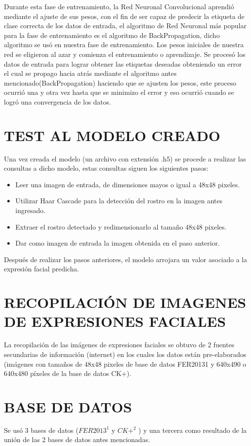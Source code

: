 Durante esta fase de entrenamiento, la Red Neuronal Convolucional aprendió
mediante el ajuste de sus pesos, con el fin de ser capaz de predecir la etiqueta de clase
correcta de los datos de entrada, el algoritmo de Red Neuronal más popular para la fase
de entrenamiento es el algoritmo de BackPropagation, dicho algoritmo se usó en nuestra
fase de entrenamiento. Los pesos iniciales de nuestra red se eligieron al azar y comienza
el entrenamiento o aprendizaje. Se procesó los datos de entrada para lograr obtener las
etiquetas deseadas obteniendo un error el cual se propago hacia atrás mediante el
algoritmo antes mencionado(BackPropagation) haciendo que se ajusten los pesos, este
proceso ocurrió una y otra vez hasta que se minimizo el error y eso ocurrió cuando se
logró una convergencia de los datos.

\section{TEST AL MODELO CREADO}
Una vez creada el modelo (un archivo con extensión .h5) se procede a realizar las
consultas a dicho modelo, estas consultas siguen los siguientes pasos:

\begin{itemize}
\item Leer una imagen de entrada, de dimensiones mayos o igual a 48x48 pixeles.
\item Utilizar Haar Cascade para la detección del rostro en la imagen antes ingresado.
\item Extraer el rostro detectado y redimensionarlo al tamaño 48x48 pixeles.
\item Dar como imagen de entrada la imagen obtenida en el paso anterior.
\end{itemize}
Después de realizar los pasos anteriores, el modelo arrojara un valor asociado a la
expresión facial predicha.

\section{RECOPILACIÓN DE IMAGENES DE EXPRESIONES
FACIALES}
La recopilación de las imágenes de expresiones faciales se obtuvo de 2 fuentes
secundarias de información (internet) en los cuales los datos están pre-elaborados
(imágenes con tamaños de 48x48 pixeles de base de datos FER20131 y 640x490 o
640x480 píxeles de la base de datos CK+).

\section{BASE DE DATOS}
Se usó 3 bases de datos ($FER2013^{1}$ y $CK+^{2}$ ) y una tercera como resultado de la
unión de las 2 bases de datos antes mencionadas.
